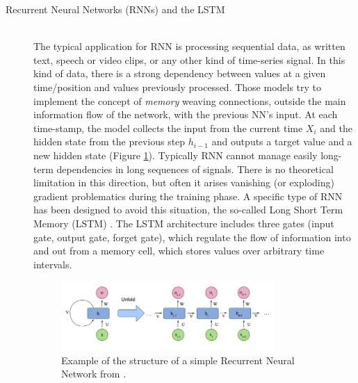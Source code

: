 \documentclass[12pt,a4paper]{report}
\begin{document}
\begin{description}
    \item [Recurrent Neural Networks (RNNs) and the LSTM] \hfill \\
        The typical application for RNN is processing sequential data, as written text, speech or video clips, or any other kind of time-series signal. In this kind of data, there is a strong dependency between values at a given time/position and values previously processed. Those models try to implement the concept of \textit{memory} weaving connections, outside the main information flow of the network, with the previous NN's input. At each time-stamp, the model collects the input from the current time $X_i$ and the hidden state from the previous step $h_{i-1}$ and outputs a target value and a new hidden state (Figure \ref{fig:recNN}). Typically RNN cannot manage easily long-term dependencies in long sequences of signals. There is no theoretical limitation in this direction, but often it arises vanishing (or exploding) gradient problematics during the training phase. A specific type of RNN has been designed to avoid this situation, the so-called Long Short Term Memory (LSTM) \cite{LSTM}. The LSTM architecture includes three gates (input gate, output gate, forget gate), which regulate the flow of information into and out from a memory cell, which stores values over arbitrary time intervals.

        \begin{figure}
            \centering
            \includegraphics[width = 0.8\textwidth]{images/recNN}
            \caption{Example of the structure of a simple Recurrent Neural Network from  \cite{deep_seg_SOA}.}
            \label{fig:recNN}
        \end{figure}


\end{description}
\end{document}
